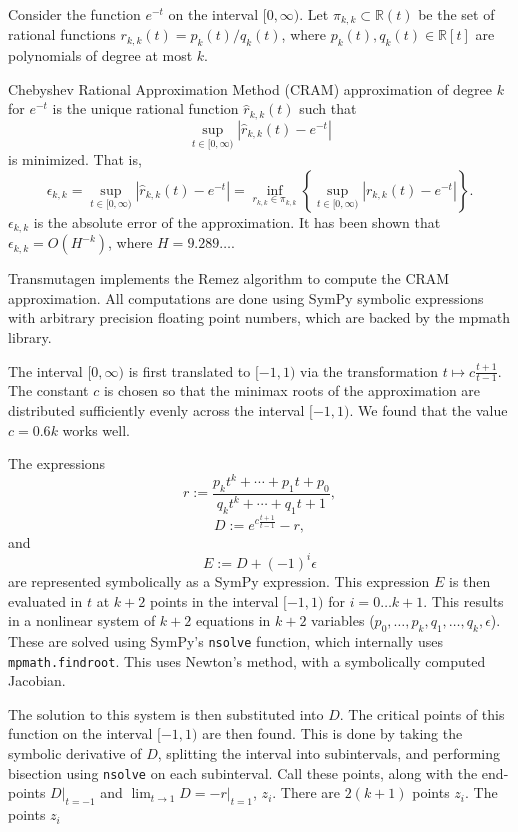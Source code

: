 Consider the function $e^{-t}$ on the interval $[0,\infty)$. Let
$\pi_{k,k}\subset \mathbb{R}(t)$ be the set of rational functions $r_{k,k}(t)
= p_k(t)/q_k(t)$, where $p_k(t), q_k(t)\in \mathbb{R}[t]$ are polynomials of
degree at most $k$.

Chebyshev Rational Approximation Method (CRAM) approximation of degree $k$
for $e^{-t}$ is the unique rational function $\hat{r}_{k,k}(t)$ such that
\begin{equation}
  \sup_{t\in[0, \infty)}|\hat{r}_{k, k}(t) - e^{-t}|
\end{equation}
is minimized. That is,
\begin{equation}
  \epsilon_{k,k} = \sup_{t\in[0, \infty)}|\hat{r}_{k, k}(t) - e^{-t}| = \inf_{r_{k,k}\in\pi_{k,k}}\left\{\sup_{t\in[0, \infty)}|r_{k, k}(t) - e^{-t}|\right\}.
\end{equation}
$\epsilon_{k,k}$ is the absolute error of the approximation. It has been shown
that $\epsilon_{k,k} = O(H^{-k})$, where $H=9.289\ldots$.

Transmutagen implements the Remez algorithm to compute the CRAM approximation.
All computations are done using SymPy symbolic expressions with arbitrary
precision floating point numbers, which are backed by the mpmath library.

The interval $[0, \infty)$ is first translated to $[-1, 1)$ via the
transformation $t\mapsto c\frac{t+1}{t-1}$.
The constant $c$ is chosen so that the minimax roots of the approximation are
distributed sufficiently evenly across the interval $[-1, 1)$. We found that
the value $c=0.6k$ works well.

The expressions
\begin{equation}
  r := \frac{p_kt^k + \cdots + p_1t + p_0}{q_kt^k + \cdots +
    q_1t + 1},
\end{equation}
\begin{equation}
  D := e^{c\frac{t+1}{t-1}} - r,
\end{equation}
and
\begin{equation}
  E := D + (-1)^i\epsilon
\end{equation}
are represented symbolically as a SymPy expression. This expression $E$ is then
evaluated in $t$ at $k + 2$ points in the interval $[-1, 1)$ for $i=0\ldots
k+1$.
This results in a nonlinear system of $k+2$ equations in $k+2$ variables
($p_0,\ldots,p_k,q_1,\ldots,q_k,\epsilon$). These are solved using SymPy's
\texttt{nsolve} function, which internally uses \texttt{mpmath.findroot}. This
uses Newton's method, with a symbolically computed Jacobian.

The solution to this system is then substituted into $D$. The critical points
of this function on the interval $[-1, 1)$ are then found. This is done by
taking the symbolic derivative of $D$, splitting the interval into
subintervals, and performing bisection using \texttt{nsolve} on each
subinterval. Call these points, along with the end-points $D|_{t=-1}$ and
$\lim_{t\to 1} D=-r|_{t=1}$, $z_i$. There are $2(k+1)$ points $z_i$. The
points $z_i$
